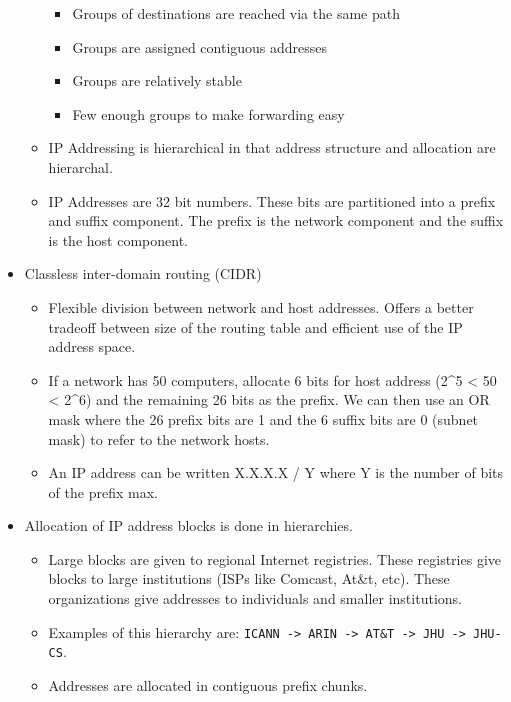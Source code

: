 \documentclass[]{article}
\providecommand{\tightlist}{%
  \setlength{\itemsep}{0pt}\setlength{\parskip}{0pt}}
\begin{document}
\begin{itemize}
\begin{itemize}
    \begin{itemize}
    \tightlist
    \item
      Groups of destinations are reached via the same path
    \item
      Groups are assigned contiguous addresses
    \item
      Groups are relatively stable
    \item
      Few enough groups to make forwarding easy
    \end{itemize}
  \item
    IP Addressing is hierarchical in that address structure and
    allocation are hierarchal.
  \item
    IP Addresses are 32 bit numbers. These bits are partitioned into a
    prefix and suffix component. The prefix is the network component and
    the suffix is the host component.
  \end{itemize}
\item
  Classless inter-domain routing (CIDR)

  \begin{itemize}
  \tightlist
  \item
    Flexible division between network and host addresses. Offers a
    better tradeoff between size of the routing table and efficient use
    of the IP address space.
  \item
    If a network has 50 computers, allocate 6 bits for host address
    (2\^{}5 \textless{} 50 \textless{} 2\^{}6) and the remaining 26 bits
    as the prefix. We can then use an OR mask where the 26 prefix bits
    are 1 and the 6 suffix bits are 0 (subnet mask) to refer to the
    network hosts.
  \item
    An IP address can be written X.X.X.X / Y where Y is the number of
    bits of the prefix max.
  \end{itemize}
\item
  Allocation of IP address blocks is done in hierarchies.

  \begin{itemize}
  \tightlist
  \item
    Large blocks are given to regional Internet registries. These
    registries give blocks to large institutions (ISPs like Comcast,
    At\&t, etc). These organizations give addresses to individuals and
    smaller institutions.
  \item
    Examples of this hierarchy are:
    \texttt{ICANN\ -\textgreater{}\ ARIN\ -\textgreater{}\ AT\&T\ -\textgreater{}\ JHU\ -\textgreater{}\ JHU-CS}.
  \item
    Addresses are allocated in contiguous prefix chunks.


\end{itemize}
\end{itemize}
\end{document}
